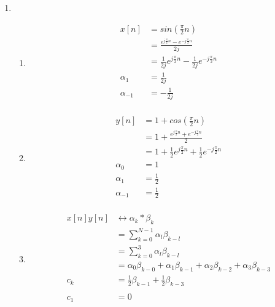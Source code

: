 \documentclass[10pt,a4paper, margin=1in]{article}
\begin{document}
\begin{enumerate}
\item %
    \begin{enumerate}
    \item %
    \begin{align*}
        x[n] & = sin(\frac{\pi}{2}n) \\
        & = \frac{e^{j\frac{\pi}{2}n} - e^{-j\frac{\pi}{2}n}}{2j} \\
        & = \frac{1}{2j}e^{j\frac{\pi}{2}n} - \frac{1}{2j}e^{-j\frac{\pi}{2}n} \\
        \alpha_1 & = \frac{1}{2j} \\
        \alpha_{-1} & = -\frac{1}{2j} \\
    \end{align*}
    \item %
    \begin{align*}
        y[n] & = 1 + cos(\frac{\pi}{2}n) \\
        & = 1 + \frac{e^{j\frac{\pi}{2}n} + e^{-j\frac{\pi}{2}n}}{2} \\
        & = 1 + \frac{1}{2}e^{j\frac{\pi}{2}n} + \frac{1}{2}e^{-j\frac{\pi}{2}n} \\
        \alpha_0 & = 1 \\
        \alpha_1 & = \frac{1}{2} \\
        \alpha_{-1} & = \frac{1}{2} \\
    \end{align*}
	\item %
    \begin{align*}
        x[n]y[n] & \leftrightarrow \alpha_k \ast \beta_k \\
        & = \sum_{k=0}^{N - 1} \alpha_l \beta_{k - l} \\
        & = \sum_{k=0}^{3} \alpha_l \beta_{k - l} \\
        & = \alpha_0 \beta_{k - 0} + \alpha_1 \beta_{k - 1} + \alpha_2 \beta_{k - 2} + \alpha_3 \beta_{k - 3} \\
        c_k & = \frac{1}{2} \beta_{k - 1} + \frac{1}{2} \beta_{k - 3} \\
        &\\
        c_1 & = 0 \\

\end{align*}
\end{enumerate}
\end{enumerate}
\end{document}
